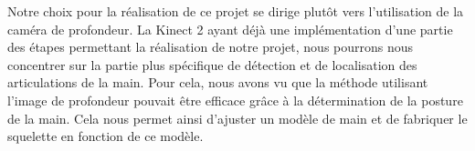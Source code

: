 Notre choix pour la réalisation de ce projet se dirige plutôt vers l'utilisation de la caméra de profondeur.
La Kinect 2 ayant déjà une implémentation d'une partie des étapes permettant la réalisation de notre projet, nous pourrons
nous concentrer sur la partie plus spécifique de détection et de localisation des articulations de la main. 
Pour cela, nous avons vu que la méthode utilisant l'image de profondeur pouvait être efficace grâce à la 
détermination de la posture de la main. Cela nous permet ainsi d'ajuster un modèle de main et de fabriquer
le squelette en fonction de ce modèle.\\
